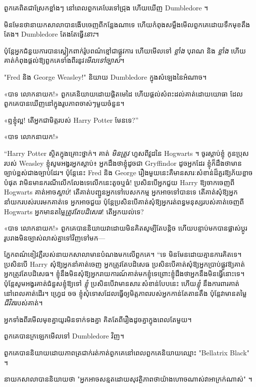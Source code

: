 {{{{{{

ពួកគេ​ពិតជា​ស្រែក​ខ្លាំងៗ នៅពេល​ពួកគេ​បែរ​ទៅ​ជ្រុង ហើយ​ឃើញ Dumbledore ។

មិនមែន​ថា​នាយក​សាលា​បាន​ងើប​ចេញ​ពី​កន្លែង​ណា​ទេ ហើយ​កំពុង​សម្លឹង​មើល​ពួកគេ​ដោយ​ទឹកមុខ​តឹងតែង។ Dumbledore តែងតែធ្វើ\emph{នោះ}។

ប៉ុន្តែអ្នកជំនួយការបានស្លៀកពាក់រ៉ូបពណ៌ខ្មៅជាផ្លូវការ ហើយមើលទៅ \emph{ខ្លាំង} បុរាណ និង \emph{ខ្លាំង} ហើយគាត់កំពុងផ្តល់ឱ្យពួកគេទាំងពីរនូវ\emph{មើលទៅច្បាស់}។

"Fred និង George Weasley!" និយាយ Dumbledore ក្នុងសំឡេងនៃអំណាច។

«បាទ លោកនាយក!» ពួកគេនិយាយដោយផ្តិតមេដៃ ហើយផ្តល់សំពះដល់គាត់ដោយយោធា ដែលពួកគេបានឃើញនៅក្នុងរូបភាពចាស់ៗមួយចំនួន។

«ឮខ្ញុំល្អ! តើអ្នកជាមិត្តរបស់ Harry Potter មែនទេ?”

«បាទ លោកនាយក!»

“Harry Potter ស្ថិតក្នុងគ្រោះថ្នាក់។ គាត់ \emph{មិនត្រូវ } ហួសពីវួដនៃ Hogwarts ។ ចូរស្តាប់ខ្ញុំ កូនប្រុសរបស់ Weasley ខ្ញុំសូមអង្វរអ្នកស្តាប់៖ អ្នកដឹងថាខ្ញុំដូចជា Gryffindor ដូចអ្នកដែរ ខ្ញុំក៏ដឹងថាមានច្បាប់ខ្ពស់ជាងច្បាប់ដែរ។ ប៉ុន្តែនេះ Fred និង George រឿងមួយនេះគឺមានសារៈសំខាន់ដ៏គួរឱ្យភ័យខ្លាចបំផុត វាមិនមានករណីលើកលែងទេលើកនេះតូចឬធំ! ប្រសិនបើអ្នកជួយ Harry ឱ្យចាកចេញពី Hogwarts គាត់អាច\emph{ស្លាប់}! តើគាត់បញ្ជូនអ្នកទៅបេសកកម្ម អ្នកអាចទៅបានទេ តើគាត់សុំឱ្យអ្នកនាំយករបស់របរមកគាត់ទេ អ្នកអាចជួយ ប៉ុន្តែប្រសិនបើគាត់សុំឱ្យអ្នករត់ពន្ធមនុស្សរបស់គាត់ចេញពី Hogwarts អ្នកមានតម្លៃ\emph{ត្រូវតែបដិសេធ}! តើអ្នកយល់ទេ?

«បាទ លោកនាយក!» ពួកគេបាននិយាយវាដោយមិនគិតសូម្បីតែបន្តិច ហើយបន្ទាប់មកបានផ្លាស់ប្តូររូបរាងមិនច្បាស់លាស់គ្នាទៅវិញទៅមក—

ភ្នែកពណ៌ខៀវភ្លឺរបស់នាយកសាលាមានបំណងមកលើពួកគេ។ “ទេ មិនមែនដោយគ្មានការគិតទេ។ ប្រសិនបើ Harry សុំឱ្យអ្នកនាំគាត់ចេញ អ្នកត្រូវតែបដិសេធ ប្រសិនបើគាត់សុំឱ្យអ្នកប្រាប់ផ្លូវឱ្យគាត់ អ្នកត្រូវតែបដិសេធ។ ខ្ញុំនឹងមិនសុំឱ្យអ្នករាយការណ៍គាត់មកខ្ញុំទេព្រោះខ្ញុំដឹងថាអ្នកនឹងមិនធ្វើនោះទេ។ ប៉ុន្តែសូមអង្វរគាត់ជំនួសខ្ញុំឱ្យទៅ \emph{ខ្ញុំ} ប្រសិនបើវាមានសារៈសំខាន់បែបនេះ ហើយ\emph{ខ្ញុំ} នឹងការពារគាត់នៅពេលគាត់ដើរ។ ហ្វ្រេដ ចច ខ្ញុំសុំទោសដែលធ្វើឲ្យមិត្តភាពរបស់អ្នកកាន់តែតានតឹង ប៉ុន្តែវាមានតម្លៃ \emph{ជីវិត}របស់គាត់។

អ្នកទាំងពីរមើលមុខគ្នាយូរមិនទាក់ទងគ្នា គិតតែពីរឿងដូចគ្នាក្នុងពេលតែមួយ។

ពួកគេបានក្រឡេកមើលទៅ Dumbledore វិញ។

ពួកគេបាននិយាយដោយភាពត្រជាក់រត់កាត់ពួកគេនៅពេលពួកគេនិយាយឈ្មោះ "Bellatrix Black" ។

នាយកសាលាបាននិយាយថា "អ្នកអាចសន្មតដោយសុវត្ថិភាពថាយ៉ាងហោចណាស់វាអាក្រក់ណាស់" ។

}}}}}}
